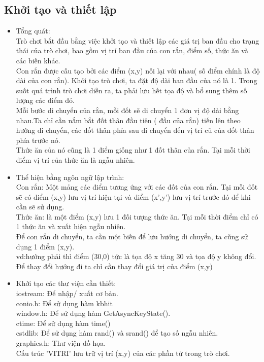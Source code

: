 \documentclass[article]{llncs}
\begin{document}
\subsection{Khởi tạo và thiết lập}
    \begin{itemize}
        \item Tổng quát:\\
    Trò chơi bắt đầu bằng việc khởi tạo và thiết lập các giá trị ban đầu cho trạng thái của trò chơi, bao gồm vị trí ban đầu của con rắn, điểm số, thức ăn và các biến khác.\\
    Con rắn được cấu tạo bởi các điểm (x,y) nối lại với nhau( số điểm chính là độ dài của con rắn). Khởi tạo trò chơi, ta đặt độ dài ban đầu của nó là 1. Trong suốt quá trình trò chơi diễn ra, ta phải lưu hết tọa độ và bổ sung thêm số lượng các điểm đó.\\
    Mỗi bước di chuyển của rắn, mỗi đốt sẽ di chuyển 1 đơn vị độ dài bằng nhau.Ta chỉ cần nắm bắt đốt thân đầu tiên ( đầu của rắn) tiến lên theo hướng di chuyển, các đốt thân phía sau di chuyển đến vị trí cũ của đốt thân phía trước nó.\\
    Thức ăn của nó cũng là 1 điểm giống như 1 đốt thân của rắn. Tại mỗi thời điểm vị trí của thức ăn là ngẫu nhiên.
    \end{itemize}
    \begin{itemize}
        \item Thể hiện bằng ngôn ngữ lập trình:\\
        Con rắn: Một mảng các điểm tương ứng với các đốt của con rắn. Tại mỗi đốt sẽ có điểm (x,y) lưu vị trí hiện tại và điểm (x',y') lưu vị trí trước đó để khi cần sẽ sử dụng.\\
        Thức ăn: là một điểm (x,y) lưu 1 đối tượng thức ăn. Tại mỗi thời điểm chỉ có 1 thức ăn và xuất hiện ngẫu nhiên.\\
        Để con rắn di chuyển, ta cần một biến để lưu hướng di chuyển, ta cũng sử dụng 1 điểm (x,y).\\
        vd:hướng phải thì điểm (30,0) tức là tọa độ x tăng 30 và tọa độ y không đổi. Để thay đổi hướng đi ta chỉ cần thay đổi giá trị của điểm (x,y)
    \end{itemize}
    \begin{itemize}
        \item Khởi tạo các thư viện cần thiết:\\
        iostream: Để nhập/ xuất cơ bản.\\
        conio.h: Để sử dụng hàm kbhit\\
        window.h: Để sử dụng hàm GetAsyncKeyState().\\
        ctime: Để sử dụng hàm time()\\
        cstdlib: Để sử dụng hàm rand() và srand() để tạo số ngẫu nhiên.\\
        graphics.h: Thư viện đồ họa.\\
        Cấu trúc 'VITRI' lưu trữ vị trí (x,y) của các phần tử trong trò chơi.
        \end{itemize}
\end{document}
